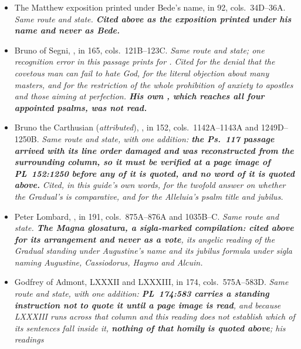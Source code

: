 \begin{itemize}[leftmargin=1.2em, itemsep=0.15em]
{distinction, for the refusal of allegory at the lilies, for the Solomon note ---
reported in the canonical edition as his opinion about what the Jews knew ---
and for
 at Mt.\ 6:33.}
\item The Matthew exposition printed under Bede's name, in  92, cols.~34D--36A. \textit{Same route and state. \textbf{Cited above
as the exposition printed under his name and never as Bede.}}
\item Bruno of Segni, , in  165, cols.~121B--123C. \textit{Same route and state; one recognition
error in this passage prints  for . Cited for the
denial that the covetous man can fail to hate God, for the literal objection
about many masters, and for the restriction of the whole prohibition of anxiety
to apostles and those aiming at perfection. \textbf{His own , which reaches all four appointed psalms, was not read.}}
\item Bruno the Carthusian (\emph{attributed}), , in
 152, cols.~1142A--1143A and 1249D--1250B.
\textit{Same route and state, with one addition: \textbf{the Ps.~117 passage
arrived with its line order damaged and was reconstructed from the surrounding
column, so it must be verified at a page image of PL~152:1250 before any of it
is quoted, and \textbf{no word of it is quoted above}.} Cited, in this guide's
own words, for the twofold answer on whether the Gradual's  is
comparative, and for the Alleluia's psalm title and jubilus.}
\item Peter Lombard, , in 
191, cols.~875A--876A and 1035B--C. \textit{Same route and state. \textbf{The
\emph{Magna glosatura}, a sigla-marked compilation: cited above for its
arrangement and never as a vote}, its angelic reading of the Gradual standing
under Augustine's name and its jubilus formula under sigla naming Augustine,
Cassiodorus, Haymo and Alcuin.}
\item Godfrey of Admont,  LXXXII and LXXXIII, in
 174, cols.~575A--583D. \textit{Same route and state,
with one addition: \textbf{PL~174:583 carries a standing instruction not to
quote it until a page image is read}, and because  LXXXIII runs
across that column and this reading does not establish which of its sentences
fall inside it, \textbf{nothing of that homily is quoted above}; his readings
}
\end{itemize}
